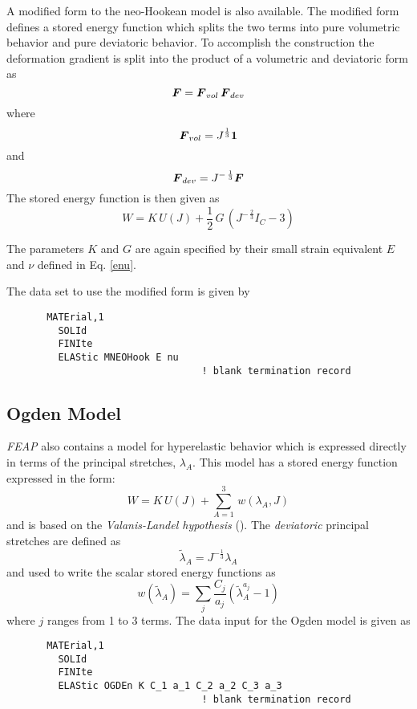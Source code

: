 A modified form to the neo-Hookean model is also available.  The modified
form defines a stored energy function which splits the two terms into
pure volumetric behavior and pure deviatoric behavior.  To accomplish
the construction the deformation gradient is split into the product of
a volumetric and deviatoric form as
\begin{equation}
\boldsymbol{F} = \boldsymbol{F}_{vol} \, \boldsymbol{F}_{dev}
\end{equation}
where
\begin{equation}
\boldsymbol{F}_{vol} = J^\frac{1}{3} \boldsymbol{1}
\end{equation}
and
\begin{equation}
\boldsymbol{F}_{dev} =  {J}^{- \, \frac{1}{3}} \boldsymbol{F}
\end{equation}
The stored energy function is then given as
\begin{equation}
W = K  \, U(J)
+ \frac{1}{2} \, G \, \left( {J}^{- \, \frac{2}{3}} I_C - 3 \right)
\end{equation}

The parameters $K$ and $G$ are again specified by their small strain
equivalent $E$ and $\nu$ defined in Eq. \ref{enu}.

The data set to use the modified form is given by
\begin{verbatim}
       MATErial,1
         SOLId
         FINIte
         ELAStic MNEOHook E nu
                                  ! blank termination record
\end{verbatim}

\subsection{Ogden Model}

{\sl FEAP} also contains a model for hyperelastic behavior which is
expressed directly in terms of the principal stretches, $\lambda_A$.
This model has a stored energy function expressed in the form:
\begin{equation}
W = K  \, U(J) + \sum_{A=1}^3 \, w(\lambda_A,J)
\end{equation}
and is based on the {\it Valanis-Landel hypothesis} (\cite{valan,ogden}).
The {\it deviatoric} principal stretches are defined as
\begin{equation}
\tilde{\lambda}_A = J^{- \frac{1}{3}} \lambda_A
\end{equation}
and used to write the scalar stored energy functions as
\begin{equation}
w(\tilde{\lambda}_A) = \sum_j \frac{C_j}{a_j} \left(
\tilde{\lambda}_A^{a_j} - 1 \right)
\end{equation}
where $j$ ranges from 1 to 3 terms.
The data input for the Ogden model is given as
\begin{verbatim}
       MATErial,1
         SOLId
         FINIte
         ELAStic OGDEn K C_1 a_1 C_2 a_2 C_3 a_3
                                  ! blank termination record
\end{verbatim}

